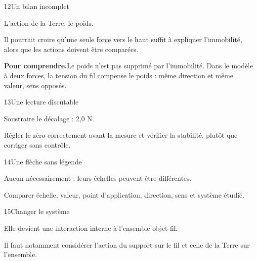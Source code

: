 \par\noindent\begin{minipage}{\linewidth}
\begin{corrige}{12}{Un bilan incomplet}
\begin{questions}
\item L’action de la Terre, le poids.
\item Il pourrait croire qu’une seule force vers le haut suffit à expliquer l’immobilité, alors que les actions doivent être comparées.
\end{questions}
\par\smallskip\noindent\textbf{Pour comprendre.}\enspace Le poids n’est pas supprimé par l’immobilité. Dans le modèle à deux forces, la tension du fil compense le poids : même direction et même valeur, sens opposés.\par
{}
\end{corrige}
\end{minipage}
\par\noindent\begin{minipage}{\linewidth}
\begin{corrige}{13}{Une lecture discutable}
\begin{questions}
\item Soustraire le décalage : 2,0 N.
\item Régler le zéro correctement avant la mesure et vérifier la stabilité, plutôt que corriger sans contrôle.
\end{questions}
\end{corrige}
\end{minipage}
\par\noindent\begin{minipage}{\linewidth}
\begin{corrige}{14}{Une flèche sans légende}
\begin{questions}
\item Aucun nécessairement : leurs échelles peuvent être différentes.
\item Comparer échelle, valeur, point d’application, direction, sens et système étudié.
\end{questions}
\end{corrige}
\end{minipage}
\par\noindent\begin{minipage}{\linewidth}
\begin{corrige}{15}{Changer le système}
\begin{questions}
\item Elle devient une interaction interne à l’ensemble objet-fil.
\item Il faut notamment considérer l’action du support sur le fil et celle de la Terre sur l’ensemble.
\end{questions}
\end{corrige}
\end{minipage}
